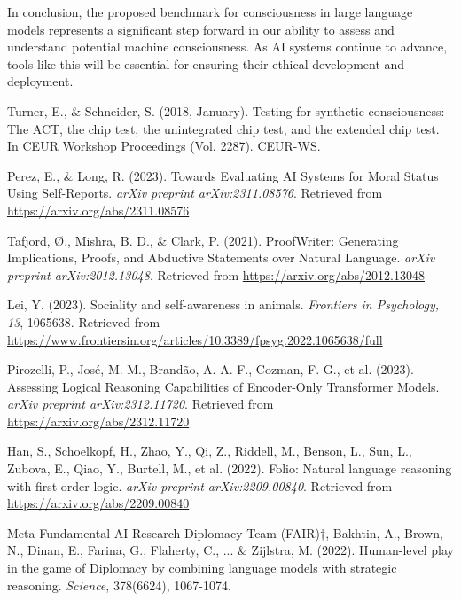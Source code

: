 \documentclass{article}
\begin{document}
In conclusion, the proposed benchmark for consciousness in large language models represents a significant step forward in our ability to assess and understand potential machine consciousness. As AI systems continue to advance, tools like this will be essential for ensuring their ethical development and deployment.


\begin{thebibliography}{99}

Turner, E., \& Schneider, S. (2018, January). Testing for synthetic consciousness: The ACT, the chip test, the unintegrated chip test, and the extended chip test. In CEUR Workshop Proceedings (Vol. 2287). CEUR-WS. 

Perez, E., \& Long, R. (2023). Towards Evaluating AI Systems for Moral Status Using Self-Reports. \textit{arXiv preprint arXiv:2311.08576}. Retrieved from \url{https://arxiv.org/abs/2311.08576}

Tafjord, Ø., Mishra, B. D., \& Clark, P. (2021). ProofWriter: Generating Implications, Proofs, and Abductive Statements over Natural Language. \textit{arXiv preprint arXiv:2012.13048}. Retrieved from \url{https://arxiv.org/abs/2012.13048}

Lei, Y. (2023). Sociality and self-awareness in animals. \textit{Frontiers in Psychology, 13}, 1065638. Retrieved from \url{https://www.frontiersin.org/articles/10.3389/fpsyg.2022.1065638/full}

Pirozelli, P., Jos{\'e}, M. M., Brand{\~a}o, A. A. F., Cozman, F. G., et al. (2023). Assessing Logical Reasoning Capabilities of Encoder-Only Transformer Models. \textit{arXiv preprint arXiv:2312.11720}. Retrieved from \url{https://arxiv.org/abs/2312.11720}

Han, S., Schoelkopf, H., Zhao, Y., Qi, Z., Riddell, M., Benson, L., Sun, L., Zubova, E., Qiao, Y., Burtell, M., et al. (2022). Folio: Natural language reasoning with first-order logic. \textit{arXiv preprint arXiv:2209.00840}. Retrieved from \url{https://arxiv.org/abs/2209.00840}

Meta Fundamental AI Research Diplomacy Team (FAIR)†, Bakhtin, A., Brown, N., Dinan, E., Farina, G., Flaherty, C., ... \& Zijlstra, M. (2022). Human-level play in the game of Diplomacy by combining language models with strategic reasoning. \textit{Science}, 378(6624), 1067-1074.


\end{thebibliography}
\end{document}
